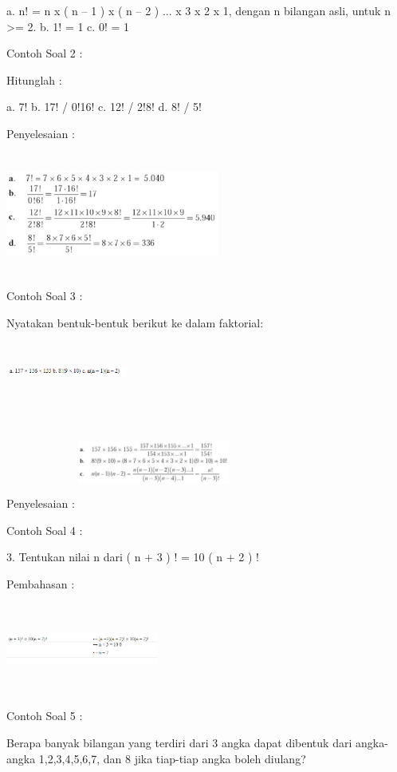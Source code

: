 \documentclass[11pt,fleqn]{book} %
\begin{document}
a. n! = n x ( n – 1 ) x ( n – 2 ) ... x 3 x 2 x 1, dengan n bilangan asli, untuk n >=  2.
b. 1! = 1
c. 0! = 1

Contoh Soal 2 :

Hitunglah :

a. 7!
b. 17! / 0!16!
c. 12! / 2!8!
d. 8! / 5!

Penyelesaian :


\includegraphics[width = 7cm, height= 4cm]{Pictures/gen3.png}

Contoh Soal 3 :

Nyatakan bentuk-bentuk berikut ke dalam faktorial:

\includegraphics[width = 4cm, height= 2cm]{Pictures/gen5.png}

Penyelesaian :
\includegraphics[width = 5cm, height=3cm]{Pictures/gen4.png}

Contoh Soal 4 :

3. Tentukan nilai n dari ( n + 3 ) ! = 10 ( n + 2 ) !

Pembahasan :


\includegraphics[width = 5cm, height= 3cm]{Pictures/gen6.png}


Contoh Soal 5 :

Berapa banyak bilangan yang terdiri dari
3 angka dapat dibentuk dari angka-angka 1,2,3,4,5,6,7, dan 8 jika tiap-tiap angka boleh diulang?
\end{document}
